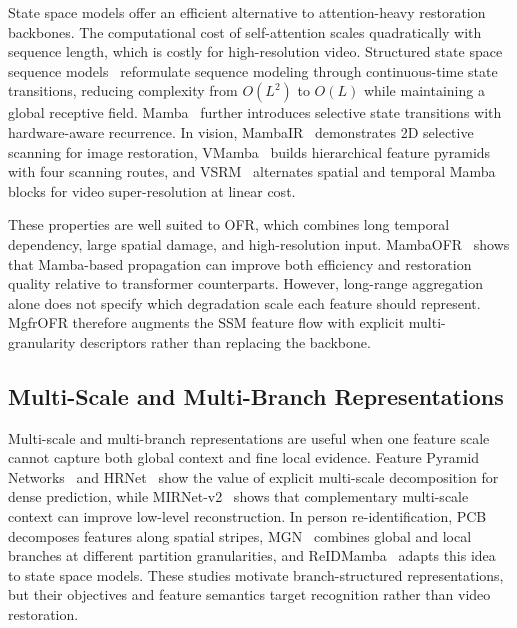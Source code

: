 State space models offer an efficient alternative to attention-heavy restoration backbones. The computational cost of self-attention scales quadratically with sequence length, which is costly for high-resolution video. Structured state space sequence models~\cite{gu2022s4} reformulate sequence modeling through continuous-time state transitions, reducing complexity from $O(L^2)$ to $O(L)$ while maintaining a global receptive field. Mamba~\cite{gu2024mamba} further introduces selective state transitions with hardware-aware recurrence. In vision, MambaIR~\cite{guo2024mambair} demonstrates 2D selective scanning for image restoration, VMamba~\cite{liu2024vmamba} builds hierarchical feature pyramids with four scanning routes, and VSRM~\cite{tran2025vsrm} alternates spatial and temporal Mamba blocks for video super-resolution at linear cost.

These properties are well suited to OFR, which combines long temporal dependency, large spatial damage, and high-resolution input. MambaOFR~\cite{mao2025mambaofr} shows that Mamba-based propagation can improve both efficiency and restoration quality relative to transformer counterparts. However, long-range aggregation alone does not specify which degradation scale each feature should represent. MgfrOFR therefore augments the SSM feature flow with explicit multi-granularity descriptors rather than replacing the backbone.

\subsection{Multi-Scale and Multi-Branch Representations}
\label{subsec:multigran}

Multi-scale and multi-branch representations are useful when one feature scale cannot capture both global context and fine local evidence. Feature Pyramid Networks~\cite{lin2017fpn} and HRNet~\cite{wang2021hrnet} show the value of explicit multi-scale decomposition for dense prediction, while MIRNet-v2~\cite{zamir2022mirnetv2} shows that complementary multi-scale context can improve low-level reconstruction. In person re-identification, PCB~\cite{sun2018pcb} decomposes features along spatial stripes, MGN~\cite{wang2018mgn} combines global and local branches at different partition granularities, and ReIDMamba~\cite{gu2025reidmamba} adapts this idea to state space models. These studies motivate branch-structured representations, but their objectives and feature semantics target recognition rather than video restoration.

